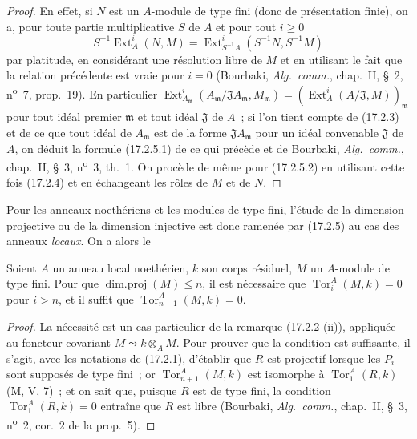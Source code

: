 \begin{proof}
En effet, si $N$ est un $A$-module de type fini (donc de présentation finie),
on a, pour toute partie multiplicative $S$ de $A$ et pour tout $i\geq0$
\[
  S^{-1}\operatorname{Ext}^i_A(N,M)
  =\operatorname{Ext}^i_{S^{-1}A}(S^{-1}N,S^{-1}M)
\]
par platitude, en considérant une résolution libre de $M$ et en utilisant le
fait que la relation précédente est vraie pour $i=0$ (Bourbaki,
\emph{Alg.~comm.}, chap.~II, \S~2, n\textsuperscript{o}~7, prop.~19). En particulier
$\operatorname{Ext}^i_{A_{\mathfrak{m}}}
(A_{\mathfrak{m}}/\mathfrak{J}A_{\mathfrak{m}},M_{\mathfrak{m}})
=(\operatorname{Ext}^i_A(A/\mathfrak{J},M))_{\mathfrak{m}}$ pour tout idéal
premier $\mathfrak{m}$ et tout idéal $\mathfrak{J}$ de $A$~; si l'on tient
compte de (17.2.3) et de ce que tout
idéal de $A_{\mathfrak{m}}$ est de la forme $\mathfrak{J}A_{\mathfrak{m}}$
pour un idéal convenable $\mathfrak{J}$ de $A$, on déduit la formule
(17.2.5.1) de ce qui précède et de Bourbaki, \emph{Alg.~comm.}, chap.~II,
\S~3, n\textsuperscript{o}~3, th.~1. On procède de même pour (17.2.5.2) en utilisant cette fois
(17.2.4) et en échangeant les rôles de $M$ et de $N$.
\end{proof}

Pour les anneaux noethériens et les modules de type fini, l'étude de la
dimension projective ou de la dimension injective est donc ramenée par
(17.2.5) au cas des anneaux \emph{locaux}. On a alors le

\begin{lemma}[17.2.6]
\label{0.17.2.6-fr}
Soient $A$ un anneau local noethérien, $k$ son corps résiduel, $M$ un
$A$-module de type fini. Pour que $\operatorname{dim.proj}(M)\leq n$, il est
nécessaire que $\operatorname{Tor}^A_i(M,k)=0$ pour $i>n$, et il suffit que
$\operatorname{Tor}^A_{n+1}(M,k)=0$.
\end{lemma}

\begin{proof}
La nécessité est un cas particulier de la remarque (17.2.2 (ii)), appliquée au
foncteur covariant $M\leadsto k\otimes_A M$. Pour prouver que la condition est
suffisante, il s'agit, avec les notations de (17.2.1), d'établir que $R$ est
projectif lorsque les $P_i$ sont supposés de type fini~; or
$\operatorname{Tor}^A_{n+1}(M,k)$ est isomorphe à
$\operatorname{Tor}^A_1(R,k)$ (M, V, 7)~; et on sait que, puisque $R$ est de
type fini, la condition $\operatorname{Tor}^A_1(R,k)=0$ entraîne que $R$ est
libre (Bourbaki, \emph{Alg.~comm.}, chap.~II, \S~3, n\textsuperscript{o}~2, cor.~2 de la
prop.~5).
\end{proof}

